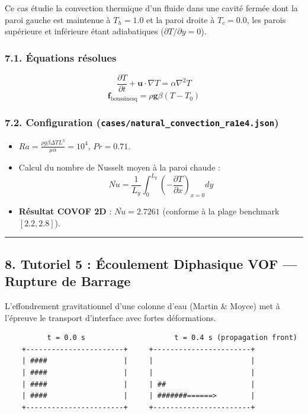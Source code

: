 \documentclass[
  french,
]{article}
\providecommand{\tightlist}{%
  \setlength{\itemsep}{0pt}\setlength{\parskip}{0pt}}
\begin{document}
Ce cas étudie la convection thermique d'un fluide dans une cavité fermée
dont la paroi gauche est maintenue à \(T_h = 1.0\) et la paroi droite à
\(T_c = 0.0\), les parois supérieure et inférieure étant adiabatiques
(\(\partial T / \partial y = 0\)).

\subsubsection{7.1. Équations résolues}\label{uxe9quations-ruxe9solues}

\[\frac{\partial T}{\partial t} + \mathbf{u} \cdot \nabla T = \alpha \nabla^2 T\]
\[\mathbf{f}_{\text{boussinesq}} = \rho \mathbf{g} \beta (T - T_0)\]

\subsubsection{\texorpdfstring{7.2. Configuration
(\texttt{cases/natural\_convection\_ra1e4.json})}{7.2. Configuration (cases/natural\_convection\_ra1e4.json)}}\label{configuration-casesnatural_convection_ra1e4.json}

\begin{itemize}
\tightlist
\item
  \(Ra = \frac{\rho g \beta \Delta T L^3}{\mu \alpha} = 10^4\),
  \(Pr = 0.71\).
\item
  Calcul du nombre de Nusselt moyen à la paroi chaude :
  \[\overline{Nu} = \frac{1}{L_y} \int_0^{L_y} \left( -\frac{\partial T}{\partial x} \right)_{x=0} dy\]
\item
  \textbf{Résultat COVOF 2D} : \(\overline{Nu} = 2.7261\) (conforme à la
  plage benchmark \([2.2, 2.8]\)).
\end{itemize}

\begin{center}\rule{0.5\linewidth}{0.5pt}\end{center}

\subsection{8. Tutoriel 5 : Écoulement Diphasique VOF --- Rupture de
Barrage}\label{tutoriel-5-uxe9coulement-diphasique-vof-rupture-de-barrage}

L'effondrement gravitationnel d'une colonne d'eau (Martin \& Moyce) met
à l'épreuve le transport d'interface avec fortes déformations.

\begin{verbatim}
          t = 0.0 s                     t = 0.4 s (propagation front)
    +-----------------------+     +-----------------------+
    | ####                  |     |                       |
    | ####                  |     |                       |
    | ####                  |     | ##                    |
    | ####                  |     | #######======>        |
    +-----------------------+     +-----------------------+
\end{verbatim}
\end{document}
